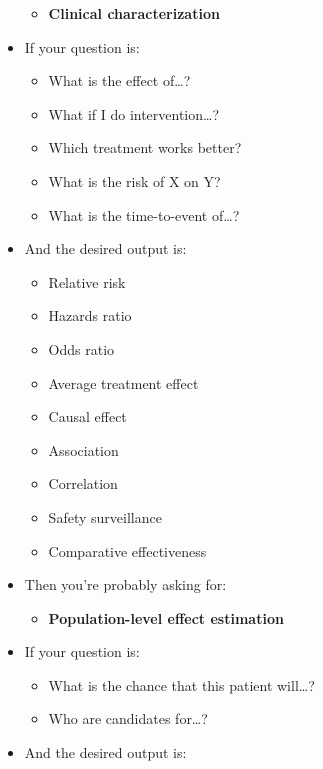 \documentclass[11pt]{book}
\providecommand{\tightlist}{%
  \setlength{\itemsep}{0pt}\setlength{\parskip}{0pt}}
\theoremstyle{definition}
\theoremstyle{definition}
\theoremstyle{definition}
\theoremstyle{remark}
\begin{document}
\begin{itemize}
  \begin{itemize}
  \tightlist
  \item
    \textbf{Clinical characterization}
  \end{itemize}
\item
  If your question is:

  \begin{itemize}
  \tightlist
  \item
    What is the effect of\ldots?
  \item
    What if I do intervention\ldots?
  \item
    Which treatment works better?
  \item
    What is the risk of X on Y?
  \item
    What is the time-to-event of\ldots?
  \end{itemize}
\item
  And the desired output is:

  \begin{itemize}
  \tightlist
  \item
    Relative risk
  \item
    Hazards ratio
  \item
    Odds ratio
  \item
    Average treatment effect
  \item
    Causal effect
  \item
    Association
  \item
    Correlation
  \item
    Safety surveillance
  \item
    Comparative effectiveness
  \end{itemize}
\item
  Then you're probably asking for:

  \begin{itemize}
  \tightlist
  \item
    \textbf{Population-level effect estimation}
  \end{itemize}
\item
  If your question is:

  \begin{itemize}
  \tightlist
  \item
    What is the chance that this patient will\ldots?
  \item
    Who are candidates for\ldots?
  \end{itemize}
\item
  And the desired output is:


\end{itemize}
\end{document}
